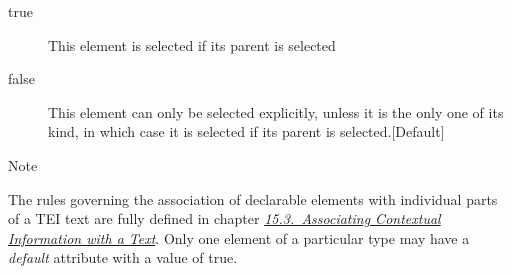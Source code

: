 \begin{reflist}
\begin{sansreflist}
\begin{reflist}
\begin{description}
\item[{true}]This element is selected if its parent is selected
\item[{false}]This element can only be selected explicitly, unless it is the only one of its kind, in which case it is selected if its parent is selected.{[Default] }
\end{description} 
\end{reflist}  
\end{sansreflist}  
    \item[{Note}]
  \par
The rules governing the association of declarable elements with individual parts of a TEI text are fully defined in chapter \textit{\hyperref[CCAS]{15.3.\ Associating Contextual Information with a Text}}. Only one element of a particular type may have a {\itshape default} attribute with a value of true.
\end{reflist}  

